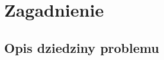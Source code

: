 \chapter{Zagadnienie }\label{Chapter_Domain}
\section{Opis dziedziny problemu}\label{Section_Problematyka}




